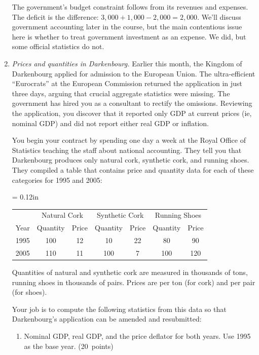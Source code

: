 \documentclass[letterpaper,12pt]{article}
\begin{document}
\begin{enumerate}
The government's budget constraint follows from its revenues and
expenses.  The deficit is the difference: $3,000 + 1,000-2,000=
2,000$.  We'll discuss government accounting later in the course,
but the main contentious issue here is whether to treat government
investment as an expense.  We did, but some official statistics do
not.




\item {\it Prices and quantities in Darkenbourg.}  
Earlier this month, the
Kingdom of Darkenbourg applied for admission to the European
Union. The ultra-efficient ``Eurocrats'' at the European Commission
returned the application in just three days, arguing that crucial
aggregate statistics were missing. The government has hired you as
a consultant to rectify the omissions. Reviewing the application,
you discover that it reported only GDP at current prices (ie,
nominal GDP) and did not report either real GDP or inflation.

You begin your contract by spending one day a week at the Royal
Office of Statistics teaching the staff about national accounting.
They tell you that Darkenbourg produces only natural cork,
synthetic cork, and running shoes.  They compiled a table that
contains price and quantity data for each of these categories for
1995 and 2005:
\begin{center}
\tabcolsep = 0.12in
\begin{tabular}{lcccccc}
\hline\hline%
     &\multicolumn{2}{c}{Natural Cork}&\multicolumn{2}{c}{Synthetic Cork} &\multicolumn{2}{c}{Running Shoes}\\%
\cline{2-7}%
Year &   Quantity & Price   & Quantity &    Price   &  Quantity & Price    \\
\hline\hline%
1995 &     100    & 12 & 10 & 22 & 80  & 90  \\%
2005 &     110    & 11 & 100 & 7 & 100 & 120 \\%
\hline\hline%
\end{tabular}
\end{center}
Quantities of natural and synthetic cork are measured in thousands
of tons, running shoes in thousands of pairs. Prices are per ton
(for cork) and per pair (for shoes).

Your job is to compute the following statistics from this data so
that Darkenbourg's application can be amended and resubmitted:
%
\begin{enumerate}
\item Nominal GDP, real GDP, and the price deflator for both
years. 
Use 1995 as the base year.  
(20~points)


\end{enumerate}
\end{enumerate}
\end{document}
